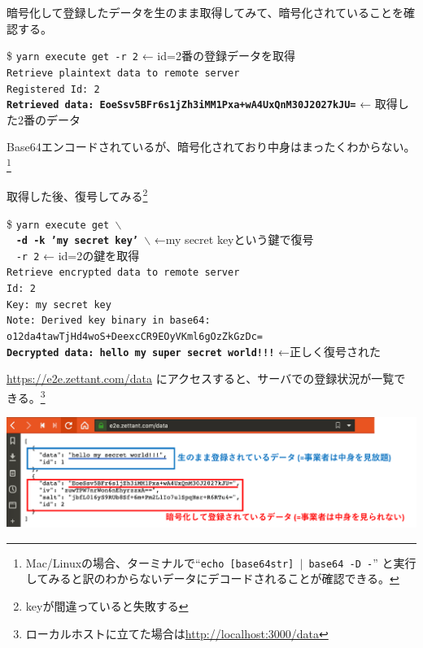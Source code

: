 \documentclass[12pt,dvipdfmx]{beamer}
\begin{document}
\begin{frame}
暗号化して登録したデータを生のまま取得してみて、暗号化されていることを確認する。
\begin{exampleblock}{}\footnotesize
\$ \texttt{yarn execute get -r 2} ← \alert{id=2番の登録データを取得}\\
\texttt{Retrieve plaintext data to remote server}\\
\texttt{Registered Id: 2}\\
\textbf{\texttt{Retrieved data: EoeSsv5BFr6s1jZh3iMM1Pxa+wA4UxQnM30J2027kJU=}} ← \alert{取得した2番のデータ}
\end{exampleblock}
Base64エンコードされているが、暗号化されており中身はまったくわからない。\footnote[frame]{Mac/Linuxの場合、ターミナルで``\texttt{echo [base64str] $\mid$ base64 -D -}'' と実行してみると訳のわからないデータにデコードされることが確認できる。}
\end{frame}

\begin{frame}
取得した後、復号してみる\footnote[frame]{keyが間違っていると失敗する}
\begin{exampleblock}{}\footnotesize
\$ \texttt{yarn execute get $\backslash$}\\
~ \textbf{\texttt{-d -k 'my secret key' $\backslash$}} ←\alert{my secret keyという鍵で復号}\\
~ \texttt{-r 2} ← id=2の鍵を取得\\
\texttt{Retrieve encrypted data to remote server}\\
\texttt{Id: 2}\\
\texttt{Key: my secret key}\\
\texttt{Note: Derived key binary in base64: o12da4tawTjHd4woS+DeexcCR9EOyVKml6gOzZkGzDc=}\\
\textbf{\texttt{Decrypted data: hello my super secret world!!!}} ←\alert{正しく復号された}
\end{exampleblock}
\end{frame}

\begin{frame}
\url{https://e2e.zettant.com/data} にアクセスすると、サーバでの登録状況が一覧できる。\footnote[frame]{ローカルホストに立てた場合は\url{http://localhost:3000/data}}

\begin{center}
\includegraphics[width=\linewidth]{FigsSample01/json_list.pdf}
\end{center}
\end{frame}
\end{document}

